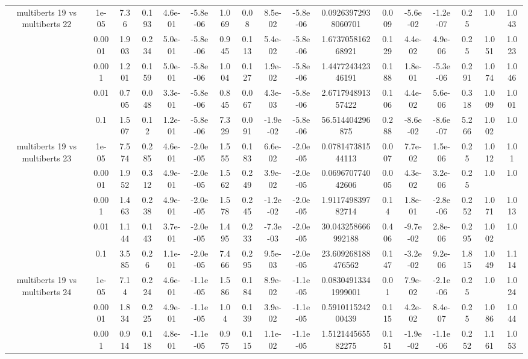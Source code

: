 \begin{tabular}{|c|c|c|c|c|c|c|c|c|c|c|c|c|c|c|c|c|}
\hline
\multirow{5}{*}{multiberts 19 vs multiberts 22} & 1e-05 & 7.36 & 0.193 & 4.6e-01 & -5.8e-06 & 1.069 & 0.08 & 8.5e-02 & -5.8e-06 & 0.09263972938060701 & 0.009 & -5.6e-02 & -1.2e-07 & 0.25 & 1.0 & 1.043 \\
 & 0.0001 & 1.903 & 0.234 & 5.0e-01 & -5.8e-06 & 0.945 & 0.113 & 5.4e-02 & -5.8e-06 & 1.673705816268921 & 0.129 & 4.4e-02 & 4.9e-06 & 0.25 & 1.051 & 1.023 \\
 & 0.001 & 1.201 & 0.159 & 5.0e-01 & -5.8e-06 & 1.004 & 0.127 & 1.9e-02 & -5.8e-06 & 1.447724342346191 & 0.188 & 1.8e-01 & -5.3e-06 & 0.291 & 1.074 & 1.046 \\
 & 0.01 & 0.705 & 0.048 & 3.3e-01 & -5.8e-06 & 0.845 & 0.067 & 4.3e-03 & -5.8e-06 & 2.671794891357422 & 0.106 & 4.4e-02 & 5.6e-06 & 0.318 & 1.009 & 1.001 \\
 & 0.1 & 1.507 & 0.12 & 1.2e-01 & -5.8e-06 & 7.329 & 0.091 & -1.9e-02 & -5.8e-06 & 56.514404296875 & 0.288 & -8.6e-02 & -8.6e-07 & 5.266 & 1.002 & 1.0 \\
\hline
\multirow{5}{*}{multiberts 19 vs multiberts 23} & 1e-05 & 7.574 & 0.285 & 4.6e-01 & -2.0e-05 & 1.555 & 0.183 & 6.6e-02 & -2.0e-05 & 0.078147381544113 & 0.007 & 7.7e-02 & 1.5e-06 & 0.25 & 1.012 & 1.01 \\
 & 0.0001 & 1.952 & 0.312 & 4.9e-01 & -2.0e-05 & 1.562 & 0.249 & 3.9e-02 & -2.0e-05 & 0.069670774042606 & 0.005 & 4.3e-02 & 3.2e-06 & 0.25 & 1.0 & 1.0 \\
 & 0.001 & 1.463 & 0.238 & 4.9e-01 & -2.0e-05 & 1.578 & 0.245 & -1.2e-02 & -2.0e-05 & 1.911749839782714 & 0.14 & 1.8e-01 & -2.8e-06 & 0.252 & 1.071 & 1.013 \\
 & 0.01 & 1.144 & 0.143 & 3.7e-01 & -2.0e-05 & 1.495 & 0.233 & -7.3e-03 & -2.0e-05 & 30.043258666992188 & 0.406 & -9.7e-02 & 2.8e-06 & 0.295 & 1.002 & 1.0 \\
 & 0.1 & 3.585 & 0.26 & 1.1e-01 & -2.0e-05 & 7.466 & 0.295 & 9.5e-03 & -2.0e-05 & 23.609268188476562 & 0.147 & -3.2e-02 & 9.2e-06 & 1.815 & 1.049 & 1.114 \\
\hline
\multirow{5}{*}{multiberts 19 vs multiberts 24} & 1e-05 & 7.14 & 0.224 & 4.6e-01 & -1.1e-05 & 1.586 & 0.184 & 8.9e-02 & -1.1e-05 & 0.08304913341999001 & 0.01 & 7.9e-02 & -2.1e-06 & 0.25 & 1.0 & 1.024 \\
 & 0.0001 & 1.834 & 0.225 & 4.9e-01 & -1.1e-05 & 1.04 & 0.139 & 3.9e-02 & -1.1e-05 & 0.591011524200439 & 0.115 & 4.2e-02 & 8.4e-07 & 0.25 & 1.086 & 1.044 \\
 & 0.001 & 0.914 & 0.118 & 4.8e-01 & -1.1e-05 & 0.975 & 0.115 & 1.1e-02 & -1.1e-05 & 1.512144565582275 & 0.151 & -1.9e-02 & -1.1e-06 & 0.252 & 1.161 & 1.053 \\

\end{tabular}
